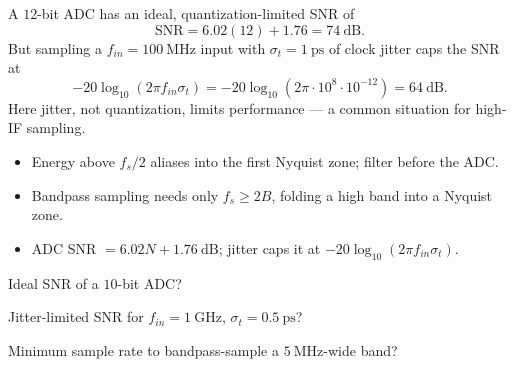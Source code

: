 \begin{workedexample}
A $12$-bit ADC has an ideal, quantization-limited SNR of
\[ \text{SNR} = 6.02(12) + 1.76 = 74\ \text{dB}. \]
But sampling a $f_{in} = 100\ \text{MHz}$ input with $\sigma_t = 1\ \text{ps}$ of
clock jitter caps the SNR at
\[ -20\log_{10}(2\pi f_{in}\sigma_t) = -20\log_{10}(2\pi\cdot10^{8}\cdot10^{-12}) = 64\ \text{dB}. \]
Here jitter, not quantization, limits performance --- a common situation for
high-IF sampling.
\end{workedexample}

\begin{keytakeaways}
\begin{itemize}[leftmargin=1.4em,itemsep=2pt]
\item Energy above $f_s/2$ aliases into the first Nyquist zone; filter before the ADC.
\item Bandpass sampling needs only $f_s \ge 2B$, folding a high band into a Nyquist zone.
\item ADC SNR $= 6.02N + 1.76\ \text{dB}$; jitter caps it at $-20\log_{10}(2\pi f_{in}\sigma_t)$.
\end{itemize}
\end{keytakeaways}

\begin{exercises}
\item Ideal SNR of a $10$-bit ADC?
\item Jitter-limited SNR for $f_{in} = 1\ \text{GHz}$, $\sigma_t = 0.5\ \text{ps}$?
\item Minimum sample rate to bandpass-sample a $5\ \text{MHz}$-wide band?
\end{exercises}

